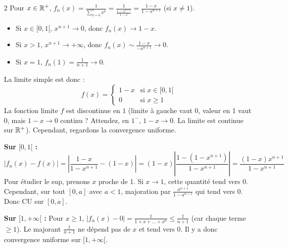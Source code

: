 \begin{correction}{2}
Pour $x \in \mathbb{R}^+$, $f_n(x) = \frac{1}{\sum_{k=0}^n x^k} = \frac{1}{\frac{1-x^{n+1}}{1-x}} = \frac{1-x}{1-x^{n+1}}$ (si $x \neq 1$).
\begin{itemize}
    \item Si $x \in [0, 1[$, $x^{n+1} \to 0$, donc $f_n(x) \to 1-x$.
    \item Si $x > 1$, $x^{n+1} \to +\infty$, donc $f_n(x) \sim \frac{1-x}{-x^{n+1}} \to 0$.
    \item Si $x = 1$, $f_n(1) = \frac{1}{n+1} \to 0$.
\end{itemize}
La limite simple est donc :
$$ f(x) = \begin{cases} 1-x & \text{si } x \in [0, 1[ \\ 0 & \text{si } x \ge 1 \end{cases} $$
La fonction limite $f$ est discontinue en $1$ (limite à gauche vaut 0, valeur en 1 vaut 0, mais $1-x \to 0$ continu ? Attendez, en $1^-$, $1-x \to 0$. La limite est continue sur $\mathbb{R}^+$).
Cependant, regardons la convergence uniforme.

\textbf{Sur $[0, 1[$ :}
$$ |f_n(x) - f(x)| = \left| \frac{1-x}{1-x^{n+1}} - (1-x) \right| = (1-x) \left| \frac{1 - (1-x^{n+1})}{1-x^{n+1}} \right| = \frac{(1-x)x^{n+1}}{1-x^{n+1}} $$
Pour étudier le sup, prenons $x$ proche de 1. Si $x \to 1$, cette quantité tend vers $0$.
Cependant, sur tout $[0, a]$ avec $a < 1$, majoration par $\frac{a^{n+1}}{1-a^{n+1}}$ qui tend vers 0. Donc CU sur $[0, a]$.

\textbf{Sur $[1, +\infty[$ :}
Pour $x \ge 1$, $|f_n(x) - 0| = \frac{1}{1+x+\dots+x^n} \le \frac{1}{n+1}$ (car chaque terme $\ge 1$).
Le majorant $\frac{1}{n+1}$ ne dépend pas de $x$ et tend vers 0.
Il y a donc convergence uniforme sur $[1, +\infty[$.
\end{correction}

